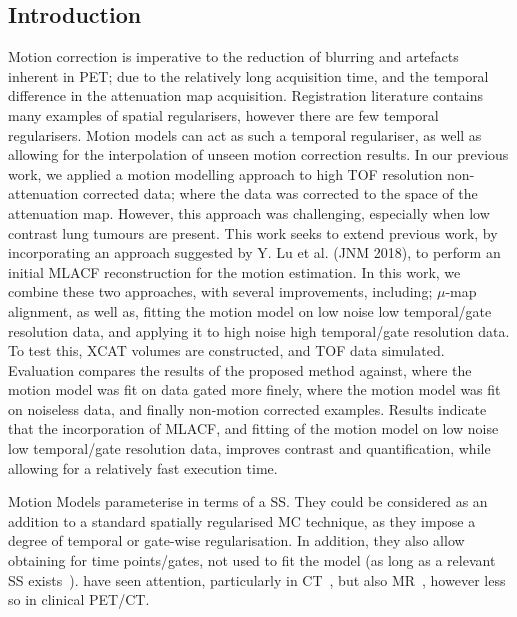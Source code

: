         \subsection{Introduction} \label{sec:pet_ct_motion_correction_exploiting_motion_models_fit_on_coarsely_gated_data_applied_to_finely_gated_data_introduction}
            Motion correction is imperative to the reduction of blurring and artefacts inherent in PET; due to the relatively long acquisition time, and the temporal difference in the attenuation map acquisition. Registration literature contains many examples of spatial regularisers, however there are few temporal regularisers. Motion models can act as such a temporal regulariser, as well as allowing for the interpolation of unseen motion correction results. In our previous work, we applied a motion modelling approach to high TOF resolution non-attenuation corrected data; where the data was corrected to the space of the attenuation map. However, this approach was challenging, especially when low contrast lung tumours are present. This work seeks to extend previous work, by incorporating an approach suggested by Y. Lu et al. (JNM 2018), to perform an initial MLACF reconstruction for the motion estimation. In this work, we combine these two approaches, with several improvements, including; $\mu$-map alignment, as well as, fitting the motion model on low noise low temporal/gate resolution data, and applying it to high noise high temporal/gate resolution data. To test this, %
            XCAT volumes are constructed, and TOF data simulated. Evaluation compares the results of the proposed method against, where the motion model was fit on data gated more finely, where the motion model was fit on noiseless data, and finally non-motion corrected examples. Results indicate that the incorporation of MLACF, and fitting of the motion model on low noise low temporal/gate resolution data, improves contrast and quantification, while allowing for a relatively fast execution time.
            
            Motion Models parameterise  in terms of a \gls{SS}. They could be considered as an addition to a standard spatially regularised \gls{MC} technique, as they impose a degree of temporal or gate-wise regularisation. In addition, they also allow obtaining  for time points/gates, not used to fit the model (as long as a relevant \gls{SS} exists~\parencite{McClelland2013}).  have seen attention, particularly in \gls{CT}~\parencite{Li2007EnhancedModel}, but also \gls{MR}~\parencite{Manke2002RespiratoryModels, Manber2016JointCorrection}, however less so in clinical \gls{PET}/\gls{CT}.
            

